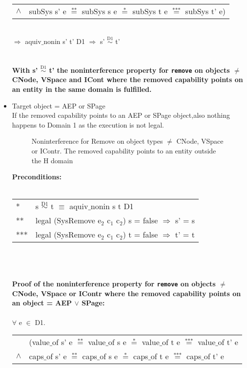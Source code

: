 \begin{itemize}
\begin{tabular}{ll}
$\wedge$ & subSys s' e $\overset{\text{**}}{=}$ subSys s e $\overset{\text{*}}{=}$ subSys t e $\overset{\text{***}}{=}$ subSys t' e)
\end{tabular} \\
$\Rightarrow$ aquiv$\_$nonin s' t' D1 $\Rightarrow$ s' $\overset{\text{D1}}{\sim}$ t' \\ \\ \\
\textbf{With s' $\overset{\text{D1}}{\sim}$ t' the noninterference property for \texttt{remove} on objects $\neq$ CNode, VSpace and ICont where the removed capability points on an entity in the same domain is fulfilled.}  
\clearpage
\item Target object = AEP or SPage \\
If the removed capability points to an AEP or SPage object,also nothing happens to Domain 1 as the execution is not legal. 
\begin{flushleft}
\begin{figure}[H]
\caption{Noninterference for Remove on object types $\neq$ CNode, VSpace or IContr. The removed capability points to an entity outside the H domain}
\label{fig:RemoveOutside2}
\end{figure}
\end{flushleft}
\textbf{Preconditions:} \\ \\
\begin{tabular}{ll}
* & s $\overset{\text{D1}}{\sim}$ t $\equiv$ aquiv$\_$nonin s t D1	\\ 
** & legal (SysRemove e$_2$ c$_1$ c$_2$) s = false $\Rightarrow$ s' = s \\ 
*** & legal (SysRemove e$_2$ c$_1$ c$_2$) t = false $\Rightarrow$ t' = t
\end{tabular} \\ \\ \\
\textbf{Proof of the noninterference property for \texttt{remove} on objects $\neq$ CNode, VSpace or IContr where the removed capability points on an object = AEP $\vee$ SPage:}\\ \\
$\forall$ e $\in$ D1. \\
\begin{tabular}{ll}
& (value$\_$of s' e $\overset{\text{**}}{=}$ value$\_$of s e $\overset{\text{*}}{=}$ value$\_$of t e $\overset{\text{***}}{=}$ value$\_$of t' e \\
$\wedge$ & caps$\_$of s' e $\overset{\text{**}}{=}$ caps$\_$of s e $\overset{\text{*}}{=}$ caps$\_$of t e $\overset{\text{***}}{=}$ caps$\_$of t' e \\

\end{tabular}
\end{itemize}
